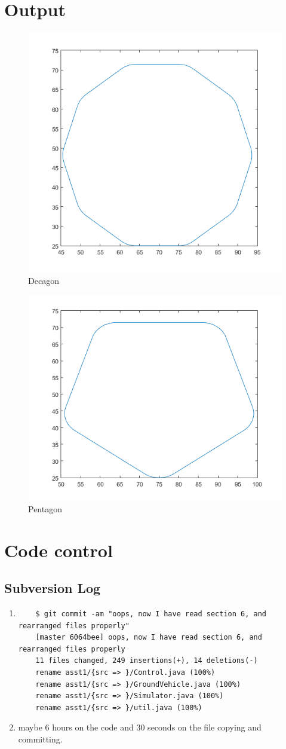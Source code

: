 \documentclass{article}
\begin{document}
\section{Output}
\begin{figure}
\centering
\includegraphics[width=0.7\linewidth]{10}
\caption[Decagon]{Decagon}
\end{figure}
\begin{figure}
\centering
\includegraphics[width=0.7\linewidth]{5}
\caption[Pentagon]{Pentagon}
\end{figure}
\section{Code control}
\subsection{Subversion Log}
\begin{enumerate}
	\item
	\begin{verbatim}
	$ git commit -am "oops, now I have read section 6, and rearranged files properly"
	[master 6064bee] oops, now I have read section 6, and rearranged files properly
	11 files changed, 249 insertions(+), 14 deletions(-)
	rename asst1/{src => }/Control.java (100%)
	rename asst1/{src => }/GroundVehicle.java (100%)
	rename asst1/{src => }/Simulator.java (100%)
	rename asst1/{src => }/util.java (100%)
	\end{verbatim}
	\item maybe 6 hours on the code and 30 seconds on the file copying and committing.
\end{enumerate}
\end{document}
